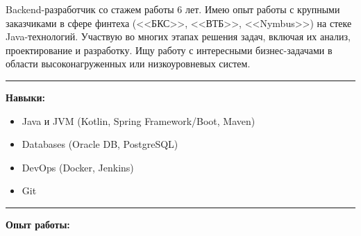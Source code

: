 \documentclass{article}
\begin{document}
Backend-разработчик со стажем работы 6 лет. Имею опыт работы с крупными заказчиками в сфере финтеха (<<БКС>>, <<ВТБ>>, <<Nymbus>>) на стеке Java-технологий. Участвую во многих этапах решения задач, включая их анализ, проектирование и разработку.
Ищу работу с интересными бизнес-задачами в области высоконагруженных или низкоуровневых систем.

\noindent\rule{\textwidth}{0.5pt}

\Large{\textbf{Навыки:}}

\normalsize{

\begin{itemize}	
	\item Java и JVM (Kotlin, Spring Framework/Boot, Maven)
	\item Databases (Oracle DB, PostgreSQL)
	\item DevOps (Docker, Jenkins)
	\item Git
\end{itemize}

}

\noindent\rule{\textwidth}{0.5pt}

\Large{\textbf{Опыт работы:}}
\end{document}
